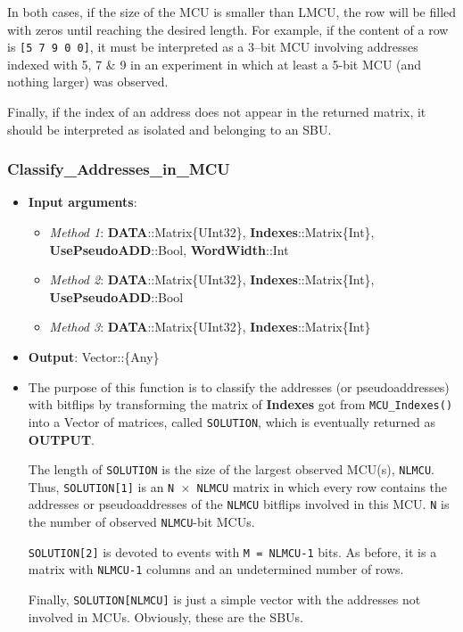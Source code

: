 \begin{itemize}
     In both cases, if the size of the MCU is smaller than LMCU, the row will be filled with zeros until
     reaching the desired length. For example, if the content of a row is \texttt{[5 7 9 0 0]}, it must be interpreted
     as a 3--bit MCU involving addresses indexed with 5, 7 \& 9 in an experiment in which at least a 5-bit 
     MCU (and nothing larger) was observed.
     
 	Finally, if the index of an address does not appear in the returned matrix, it should be interpreted as  isolated and belonging to an SBU.
 	
 \end{itemize}
%
\subsubsection*{Classify\_Addresses\_in\_MCU}
%
\begin{itemize}
	\item \textbf{Input arguments}: 
		\begin{itemize}
			\item \textit{Method 1}: \textbf{DATA}::Matrix\{UInt32\}, 
			\textbf{Indexes}::Matrix\{Int\}, 
			\textbf{UsePseudoADD}::Bool, 
			\textbf{WordWidth}::Int
			\item \textit{Method 2}: \textbf{DATA}::Matrix\{UInt32\}, 
			\textbf{Indexes}::Matrix\{Int\}, 
			\textbf{UsePseudoADD}::Bool 
			\item \textit{Method 3}: \textbf{DATA}::Matrix\{UInt32\}, 
			\textbf{Indexes}::Matrix\{Int\}
		\end{itemize}
	\item \textbf{Output}: Vector::\{Any\}
	\item The purpose of this function is to classify the addresses (or pseudoaddresses) with bitflips by transforming the matrix of \textbf{Indexes} got from \texttt{MCU\_Indexes()} into a Vector of matrices, called \texttt{SOLUTION}, which is eventually returned as \textbf{OUTPUT}.
	 
	The length of \texttt{SOLUTION} is the size of the largest observed MCU(s), \texttt{NLMCU}. Thus, \texttt{SOLUTION[1]} is an \texttt{N \(\times\) NLMCU} matrix in which every row contains the addresses or pseudoaddresses of the \texttt{NLMCU} 	bitflips involved in this MCU. \texttt{N} is the number of observed \texttt{NLMCU}-bit MCUs.
	
	\texttt{SOLUTION[2]} is devoted to events with \texttt{M = NLMCU-1} bits. As before, it is a matrix with \texttt{NLMCU-1} 	columns and an undetermined number of rows.
	
	Finally, \texttt{SOLUTION[NLMCU]} is just a simple vector with the addresses not involved in MCUs. Obviously, these are the SBUs.
\end{itemize}

